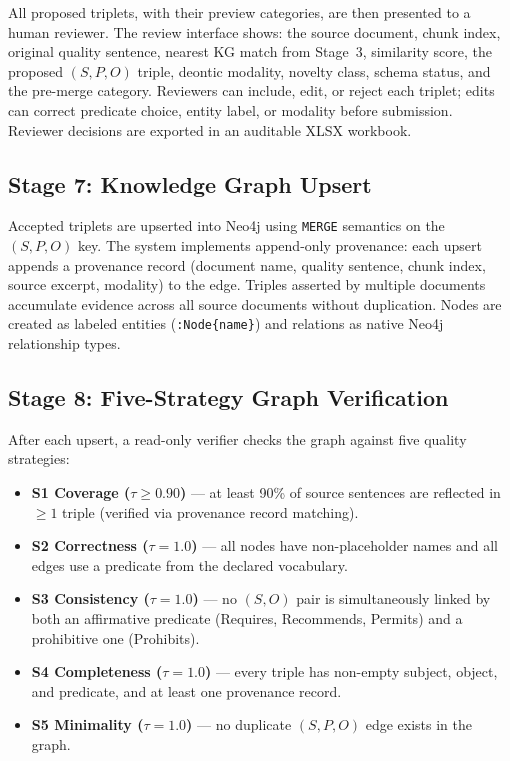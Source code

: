 All proposed triplets, with their preview categories, are then presented to a human reviewer.
The review interface shows: the source document, chunk index, original quality sentence,
nearest KG match from Stage~3, similarity score, the proposed $(S, P, O)$ triple,
deontic modality, novelty class, schema status, and the pre-merge category. Reviewers
can include, edit, or reject each triplet; edits can correct predicate choice, entity
label, or modality before submission. Reviewer decisions are exported in an auditable
XLSX workbook.

\subsection{Stage 7: Knowledge Graph Upsert}

Accepted triplets are upserted into Neo4j using \texttt{MERGE} semantics on the $(S, P, O)$
key. The system implements append-only provenance: each upsert appends a provenance record
(document name, quality sentence, chunk index, source excerpt, modality) to the edge. Triples
asserted by multiple documents accumulate evidence across all source documents without
duplication. Nodes are created as labeled entities (\texttt{:Node\{name\}}) and relations as
native Neo4j relationship types.

\subsection{Stage 8: Five-Strategy Graph Verification}

After each upsert, a read-only verifier checks the graph against five quality strategies:

\begin{itemize}
    \item \textbf{S1 Coverage ($\tau \geq 0.90$)} — at least 90\% of source sentences are
    reflected in $\geq 1$ triple (verified via provenance record matching).
    \item \textbf{S2 Correctness ($\tau = 1.0$)} — all nodes have non-placeholder names and
    all edges use a predicate from the declared vocabulary.
    \item \textbf{S3 Consistency ($\tau = 1.0$)} — no $(S, O)$ pair is simultaneously linked
    by both an affirmative predicate (Requires, Recommends, Permits) and a prohibitive one
    (Prohibits).
    \item \textbf{S4 Completeness ($\tau = 1.0$)} — every triple has non-empty subject, object,
    and predicate, and at least one provenance record.
    \item \textbf{S5 Minimality ($\tau = 1.0$)} — no duplicate $(S, P, O)$ edge exists in
    the graph.
\end{itemize}

